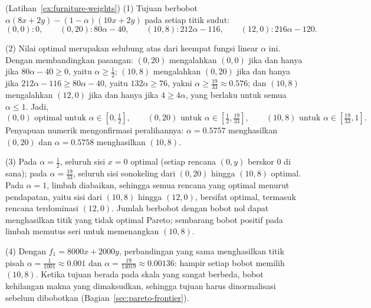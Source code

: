 \begin{solution}(Latihan~\ref{ex:furniture-weights})
(1) Tujuan berbobot $\alpha(8x + 2y) - (1-\alpha)(10x + 2y)$ pada setiap titik sudut:
\[
(0,0): 0, \qquad
(0,20): 80\alpha - 40, \qquad
(10,8): 212\alpha - 116, \qquad
(12,0): 216\alpha - 120.
\]

(2) Nilai optimal merupakan selubung atas dari keempat fungsi linear $\alpha$ ini. Dengan membandingkan pasangan: $(0,20)$ mengalahkan $(0,0)$ jika dan hanya jika $80\alpha - 40 \geq 0$, yaitu $\alpha \geq \tfrac12$; $(10,8)$ mengalahkan $(0,20)$ jika dan hanya jika $212\alpha - 116 \geq 80\alpha - 40$, yaitu $132\alpha \geq 76$, yakni $\alpha \geq \tfrac{19}{33} \approx 0.576$; dan $(10,8)$ mengalahkan $(12,0)$ jika dan hanya jika $4 \geq 4\alpha$, yang berlaku untuk semua $\alpha \leq 1$. Jadi,
\[
(0,0) \text{ optimal untuk } \alpha \in [0, \tfrac12], \qquad
(0,20) \text{ untuk } \alpha \in [\tfrac12, \tfrac{19}{33}], \qquad
(10,8) \text{ untuk } \alpha \in [\tfrac{19}{33}, 1].
\]
Penyapuan numerik mengonfirmasi peralihannya: $\alpha = 0.5757$ menghasilkan $(0,20)$ dan $\alpha = 0.5758$ menghasilkan $(10,8)$.

(3) Pada $\alpha = \tfrac12$, seluruh sisi $x = 0$ optimal (setiap rencana $(0,y)$ berskor $0$ di sana); pada $\alpha = \tfrac{19}{33}$, seluruh sisi sonokeling dari $(0,20)$ hingga $(10,8)$ optimal. Pada $\alpha = 1$, limbah diabaikan, sehingga semua rencana yang optimal menurut pendapatan, yaitu sisi dari $(10,8)$ hingga $(12,0)$, bersifat optimal, termasuk rencana terdominasi $(12,0)$. Jumlah berbobot dengan bobot nol dapat menghasilkan titik yang tidak optimal Pareto; sembarang bobot positif pada limbah memutus seri untuk memenangkan $(10,8)$.

(4) Dengan $f_1 = 8000x + 2000y$, perbandingan yang sama menghasilkan titik pisah $\alpha = \tfrac{1}{1001} \approx 0.001$ dan $\alpha = \tfrac{19}{14019} \approx 0.00136$: hampir setiap bobot memilih $(10,8)$. Ketika tujuan berada pada skala yang sangat berbeda, bobot kehilangan makna yang dimaksudkan, sehingga tujuan harus dinormalisasi sebelum dibobotkan (Bagian~\ref{sec:pareto-frontier}).
\end{solution}
